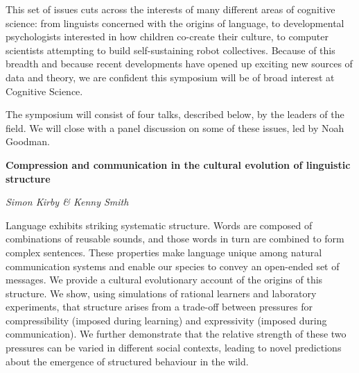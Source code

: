 \documentclass[10pt,letterpaper]{article}
\begin{document}
This set of issues cuts across the interests of many different areas of cognitive science: from linguists concerned with the origins of language, to developmental psychologists interested in how children co-create their culture, to computer scientists attempting to build self-sustaining robot collectives. 
Because of this breadth and because recent developments have opened up exciting new sources of data and theory, we are confident this symposium will be of broad interest at Cognitive Science.

The symposium will consist of four talks, described below, by the leaders of the field.
We will close with a panel discussion on some of these issues, led by Noah Goodman.


\begin{center}\textbf{Compression and communication in the cultural evolution of linguistic structure}\end{center}
\begin{center}\emph{Simon Kirby \& Kenny Smith}\end{center}

Language exhibits striking systematic structure. Words are composed of combinations of reusable sounds, and those words in turn are combined to form complex sentences. These properties make language unique among natural communication systems and enable our species to convey an open-ended set of messages.  We provide a cultural evolutionary account of the origins of this structure. We show, using simulations of rational learners and laboratory experiments, that structure arises from a trade-off between pressures for compressibility (imposed during learning) and expressivity (imposed during communication). We further demonstrate that the relative strength of these two pressures can be varied in different social contexts, leading to novel predictions about the emergence of structured behaviour in the wild.
\end{document}
